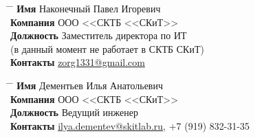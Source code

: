 \parbox{0.4\textwidth}{ %
\begin{tabbing}
\hspace{2.75cm} \= \hspace{4cm} \= \kill %
{\bf Имя} \> Наконечный Павел Игоревич \\ %
{\bf Компания} \> ООО <<СКТБ <<СКиТ>> \\ %
{\bf Должность} \> Заместитель директора по ИТ\\
(в данный момент не работает в СКТБ СКиТ) \\ %
{\bf Контакты} \> \href{mailto:zorg1331@gmail.com}{zorg1331@gmail.com} %
\end{tabbing}}
\hfill %
\parbox{0.4\textwidth}{ %
\begin{tabbing}
\hspace{2.75cm} \= \hspace{4cm} \= \kill %
{\bf Имя} \> Дементьев Илья Анатольевич\\ %
{\bf Компания} \> ООО <<СКТБ <<СКиТ>> \\ %
{\bf Должность} \> Ведущий инженер \\ %
{\bf Контакты} \> \href{mailto:ilya.dementev@skitlab.ru}{ilya.dementev@skitlab.ru}, +7 (919) 832-31-35 %
\end{tabbing}}



